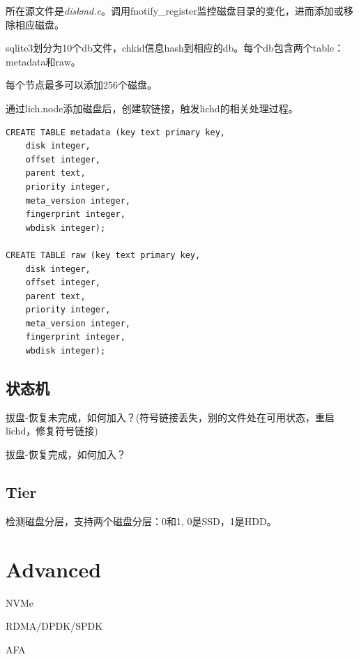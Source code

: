 所在源文件是\emph{diskmd.c}。调用fnotify\_register监控磁盘目录的变化，进而添加或移除相应磁盘。

sqlite3划分为10个db文件，chkid信息hash到相应的db。每个db包含两个table：metadata和raw。

每个节点最多可以添加256个磁盘。

通过lich.node添加磁盘后，创建软链接，触发lichd的相关处理过程。

\begin{lstlisting}[frame=single]
CREATE TABLE metadata (key text primary key,
    disk integer,
    offset integer,
    parent text,
    priority integer,
    meta_version integer,
    fingerprint integer,
    wbdisk integer);

CREATE TABLE raw (key text primary key,
    disk integer,
    offset integer,
    parent text,
    priority integer,
    meta_version integer,
    fingerprint integer,
    wbdisk integer);
\end{lstlisting}

\subsection{状态机}

拔盘-恢复未完成，如何加入？(符号链接丢失，别的文件处在可用状态，重启lichd，修复符号链接)

拔盘-恢复完成，如何加入？

\subsection{Tier}

检测磁盘分层，支持两个磁盘分层：0和1, 0是SSD，1是HDD。

\section{Advanced}

NVMe

RDMA/DPDK/SPDK

AFA
